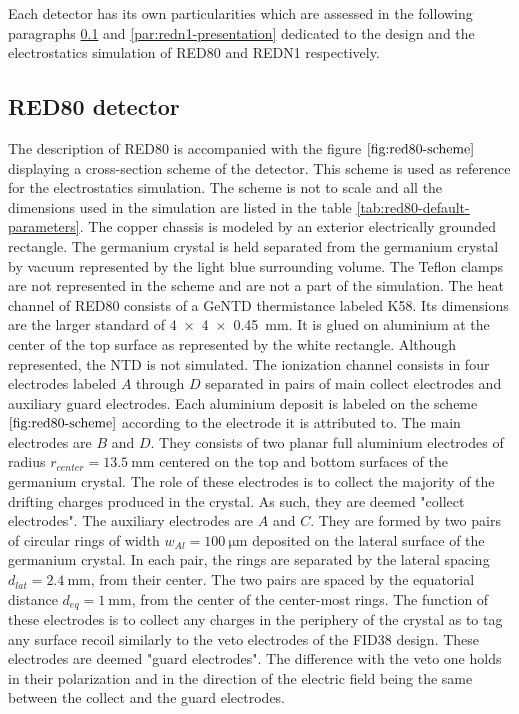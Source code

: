 Each detector has its own particularities which are assessed in the following paragraphs \ref{par:red80-presentation} and \ref{par:redn1-presentation} dedicated to the design and the electrostatics simulation of RED80 and REDN1 respectively.


\subsection{RED80 detector}
\label{par:red80-presentation}

The description of RED80 is accompanied with the figure $\ref{fig:red80-scheme}$ displaying a cross-section scheme of the detector. This scheme is used as reference for the electrostatics simulation. The scheme is not to scale and all the dimensions used in the simulation are listed in the table \ref{tab:red80-default-parameters}.
The copper chassis is modeled by an exterior electrically grounded rectangle. The germanium crystal is held separated from the germanium crystal by vacuum represented by the light blue surrounding volume.
The Teflon clamps are not represented in the scheme and are not a part of the simulation.
The heat channel of RED80 consists of a GeNTD thermistance labeled K58. Its dimensions are the larger \Edelweiss{} standard of \SI{4 x 4 x 0.45}{\mm}. It is glued on aluminium at the center of the top surface as represented by the white rectangle. Although represented, the NTD is not simulated.
The ionization channel consists in four electrodes labeled $A$ through $D$ separated in pairs of main collect electrodes and auxiliary guard electrodes. Each aluminium deposit is labeled on the scheme $\ref{fig:red80-scheme}$ according to the electrode it is attributed to.
The main electrodes are $B$ and $D$. They consists of two planar full aluminium electrodes of radius $r_{center} = \SI{13.5}{\mm}$ centered on the top and bottom surfaces of the germanium crystal. The role of these electrodes is to collect the majority of the drifting charges produced in the crystal. As such, they are deemed "collect electrodes".
The auxiliary electrodes are $A$ and $C$. They are formed by two pairs of circular rings of width $w_{Al}=\SI{100}{\micro\meter}$ deposited on the lateral surface of the germanium crystal. In each pair, the rings are separated by the lateral spacing $d_{lat}=\SI{2.4}{\mm}$, from their center. The two pairs are spaced by the equatorial distance $d_{eq} = \SI{1}{\mm}$, from the center of the center-most rings. The function of these electrodes is to collect any charges in the periphery of the crystal as to tag any surface recoil similarly to the veto electrodes of the FID38 design. These electrodes are deemed "guard electrodes". The difference with the veto one holds in their polarization and in the direction of the electric field being the same between the collect and the guard electrodes.
